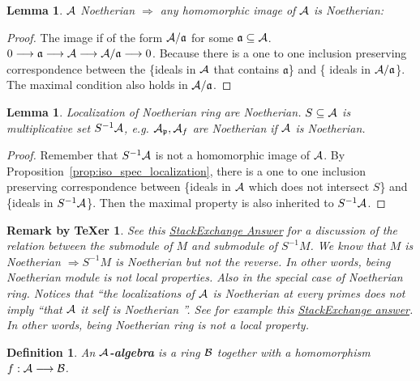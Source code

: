 \documentclass[11pt]{article}
\newtheorem{lemma}[thm]{Lemma}
\newtheorem{dfn}[thm]{Definition}
\newtheorem{rmkt}[thm]{Remark by TeXer}
\newcommand{\sca}{{\mathfrak a}}
\newcommand{\scp}{{\mathfrak p}}
\newcommand{\cala}{{\cal A}}
\newcommand{\calb}{{\cal B}}
\newcommand{\Lrta}{\Longrightarrow}
\newcommand{\lrta}{\longrightarrow}
\begin{document}
\begin{lemma}\label{lem:homomorphic_image_Noetherian}
$\cala$ Noetherian
$\Lrta$ any homomorphic image of $\cala$ is Noetherian:
\end{lemma}
\begin{proof}
The image if of the form $\cala/\sca$ for some $\sca\subseteq \cala$.
$0\lrta \sca\lrta \cala\lrta \cala/\sca\lrta 0$. Because there is a one to one inclusion preserving  correspondence between the \{ideals in $\cala$ that contains $\sca$\} and \{ ideals in $\cala/\sca$\}. The maximal condition also holds in $\cala/\sca$.
\end{proof}
\begin{lemma}
Localization of  Noetherian ring are Noetherian. $S\subseteq \cala$ is multiplicative set $S^{-1}\cala$, e.g. $\cala_\scp,\cala_f$ are Noetherian if $\cala$ is Noetherian.
\end{lemma}
\begin{proof}
Remember that $S^{-1}\cala$ is not a homomorphic image of $\cala$. By Proposition~\ref{prop:iso_spec_localization}, there is a one to one inclusion preserving correspondence between \{ideals in $\cala$ which does not intersect $S$\} and \{ideals in $S^{-1}\cala$\}. Then the maximal property is also inherited to $S^{-1}\cala$.
\end{proof}
\begin{rmkt}
See this \href{https://math.stackexchange.com/questions/110735/why-is-the-localization-of-a-commutative-noetherian-ring-still-noetherian}{StackExchange Answer} for a discussion of the relation between the submodule of $M$ and submodule of $S^{-1}M$. We know that $M$ is Noetherian $\Lrta S^{-1}M$ is Noetherian but not the reverse. 
In other words, being Noetherian module is not local properties. 
Also in the special case of Noetherian ring. Notices that ``the localizations of $\cala$ is Noetherian at every primes does not imply ``that $\cala$ it self is Noetherian  ''. See for example this \href{https://math.stackexchange.com/questions/73421/a-non-noetherian-ring-with-all-localizations-noetherian}{StackExchange answer}. In other words, being Noetherian ring is not a local property.
\end{rmkt}

\begin{dfn}
An \textbf{$\cala$-algebra} is a ring $\calb$ together with a homomorphism $f:\cala\lrta \calb$.
\end{dfn}
\end{document}
